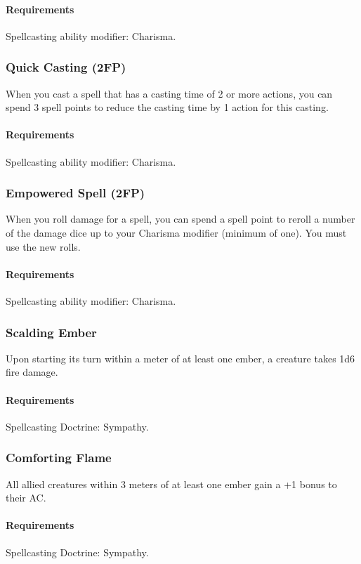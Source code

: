     \paragraph{Requirements} Spellcasting ability modifier: Charisma.
\subsubsection{Quick Casting (2FP)} \label{feat::quickcasting}
    When you cast a spell that has a casting time of 2 or more actions, you can spend 3 spell points to reduce the casting time by 1 action for this casting.
    \paragraph{Requirements} Spellcasting ability modifier: Charisma.
\subsubsection{Empowered Spell (2FP)} \label{feat::empoweredspell}
    When you roll damage for a spell, you can spend a spell point to reroll a number of the damage dice up to your Charisma modifier (minimum of one).
    You must use the new rolls.
    \paragraph{Requirements} Spellcasting ability modifier: Charisma.

\subsubsection{Scalding Ember} \label{feat::scaldingember}
    Upon starting its turn within a meter of at least one ember, a creature takes 1d6 fire damage.
    \paragraph{Requirements} Spellcasting Doctrine: Sympathy.
\subsubsection{Comforting Flame} \label{feat::comfortingflame}
    All allied creatures within 3 meters of at least one ember gain a +1 bonus to their AC.
    \paragraph{Requirements} Spellcasting Doctrine: Sympathy.
